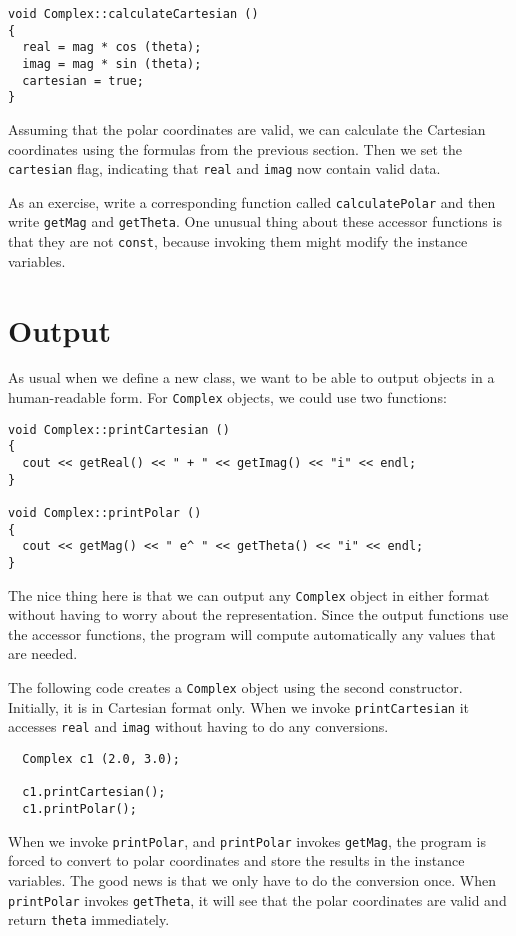 \begin{verbatim}
void Complex::calculateCartesian ()
{
  real = mag * cos (theta);
  imag = mag * sin (theta);
  cartesian = true;
}
\end{verbatim}
%
Assuming that the polar coordinates are valid, we
can calculate the Cartesian coordinates using the formulas
from the previous section.  Then we
set the {\tt cartesian} flag, indicating that {\tt real}
and {\tt imag} now contain valid data.

As an exercise, write a corresponding function called
{\tt calculatePolar} and then write {\tt getMag}
and {\tt getTheta}.  One unusual thing about these
accessor functions is that they are not {\tt const},
because invoking them might modify the instance variables.

\section{Output}

As usual when we define a new class, we want to be able to
output objects in a human-readable form.  For {\tt Complex}
objects, we could use two functions:

\begin{verbatim}
void Complex::printCartesian ()
{
  cout << getReal() << " + " << getImag() << "i" << endl;
}

void Complex::printPolar ()
{
  cout << getMag() << " e^ " << getTheta() << "i" << endl;
}
\end{verbatim}
%
The nice thing here is that we can output any {\tt Complex} object in
either format without having to worry about the representation.  Since
the output functions use the accessor functions, the program
will compute automatically any values that are needed.

The following code creates a {\tt Complex} object using the
second constructor.   Initially, it is in Cartesian format only.
When we invoke {\tt printCartesian} it accesses {\tt real} and
{\tt imag} without having to do any conversions.

\begin{verbatim}
  Complex c1 (2.0, 3.0);

  c1.printCartesian();
  c1.printPolar();
\end{verbatim}
%
When we invoke {\tt printPolar}, and {\tt printPolar} invokes
{\tt getMag}, the program is forced to convert to polar
coordinates and store the results in the instance variables.
The good news is that we only have to do the conversion
once.  When {\tt printPolar} invokes {\tt getTheta}, it will
see that the polar coordinates are valid and return {\tt theta}
immediately.

